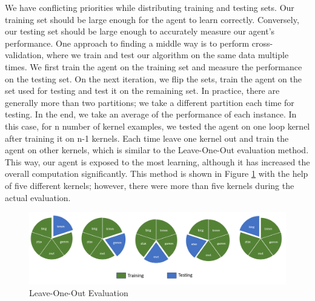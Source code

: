 \documentclass[logo,msc]{infthesis}           %
\begin{document}
We have conflicting priorities while distributing training and testing sets. Our training set should be large enough for the agent to learn correctly. Conversely, our testing set should be large enough to accurately measure our agent's performance. One approach to finding a middle way is to perform cross-validation, where we train and test our algorithm on the same data multiple times. We first train the agent on the training set and measure the performance on the testing set. On the next iteration, we flip the sets, train the agent on the set used for testing and test it on the remaining set. In practice, there are generally more than two partitions; we take a different partition each time for testing. In the end, we take an average of the performance of each instance. In this case, for n number of kernel examples, we tested the agent on one loop kernel after training it on n-1 kernels. Each time leave one kernel out and train the agent on other kernels, which is similar to the Leave-One-Out evaluation method\cite{inbook}. This way, our agent is exposed to the most learning, although it has increased the overall computation significantly. This method is shown in Figure \ref{fig:leave_one_out} with the help of five different kernels; however, there were more than five kernels during the actual evaluation.

\begin{figure}[htbp]
  \centering
  \includegraphics[width=\textwidth]{Images/Leave_One_Out.png}   
  \caption{Leave-One-Out Evaluation}
  \label{fig:leave_one_out} 
\end{figure}
\end{document}
